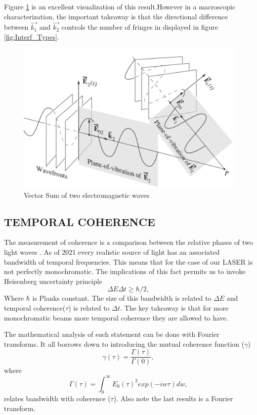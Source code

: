 Figure \ref{fig:VectorInterf} is an excellent visualization of this result.However in a macroscopic characterization, the important takeaway is that the directional difference between  $\vec{k_1} $ and $\vec{k_2}$ controls the number of fringes in displayed in figure \ref{fig:Interf_Types}. 

\begin{figure}[H]
    \centering
    \includegraphics[scale=0.30]{Figures/Figures_I/Vectorsum_Interference.png}
    \caption{Vector Sum of two electromagnetic waves \cite{hecht1987optics}}
    \label{fig:VectorInterf}
\end{figure}

\subsection{TEMPORAL COHERENCE}
The measurement of coherence is a comparison between the relative phases of two light waves \cite{guenther2015modern}. As of 2021 every realistic source of light has an associated bandwidth of temporal frequencies. This means that for the case of our LASER is not perfectly monochromatic. The implications of this fact permits us to invoke Heisenberg uncertainty principle 
\begin{equation} 
\Delta E \Delta t\ge \hbar/2 ,
\end{equation} 
Where $\hbar$ is Planks constant. The size of this bandwidth is related to $\Delta E$ and temporal coherence($\tau$) is related to $\Delta t$. The key takeaway is that for more monochromatic beams more temporal coherence they are allowed to have. 

The mathematical analysis of such statement can be done with Fourier transforms. It all borrows down to introducing the mutual coherence function ($\gamma$)
\begin{equation}
 \gamma (\tau) = \frac{\Gamma(\tau)}{\Gamma(0)},
\end{equation}
where 
\begin{equation}
 \Gamma (\tau) = \int_0^{\infty} E_0(\tau)^2 exp(-iw\tau) dw,
\end{equation}
relates bandwidth with coherence ($\tau$). Also note the last results is a Fourier transform. 

